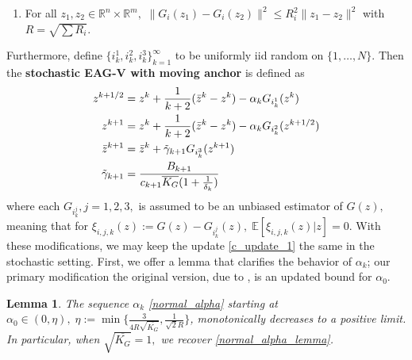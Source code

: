\documentclass[11pt,reqno,oneside]{amsart}
\newtheorem{lemma}[theorem]{Lemma}
\newtheorem{condition}[theorem]{Condition}
\theoremstyle{definition}
\numberwithin{equation}{section}
\begin{document}
\begin{enumerate}
\begin{condition}
\begin{align}
        \mathbb{E}[\big{(}\overline{C_{G}}(z^{k+1/2})-1\big{)}\|G(z^{k+1/2})\|^{2}|\bar{z}^{k},z^{k}] &\leq \frac{C_{2}}{(k+1)^{4}}, \label{summ_cond_2}
    \end{align}
    where $C_{1}, C_{2}$ are fixed positive constants.
    \end{condition}
    With \cref{summability_condition} in mind, we will henceforth use the notation $C_{G}(z^{k}), K_{G}(z^{k})$ to indicate two nonnegative, real-valued functions from $\mathbb{R}^{n} \times \mathbb{R}^{m}$ to $\mathbb{R}$ that behave according to \eqref{summ_cond_1}, \eqref{summ_cond_2}.
    In particular, we note that for any $z^{k}$ coming from a stochastic algorithm, we have that eventually,
    \begin{equation}
        C_{G}(z^{k}) \leq \overline{C_{G}},
    \end{equation}
    where we define $\bar{C_{G}}$ to be the supremum of such condition numbers independent of $z$.
    \label{condition2}
    \item For all $z_{1}, z_{2} \in \mathbb{R}^{n} \times \mathbb{R}^{m},$ $\displaystyle \|G_{i}(z_{1}) - G_{i}(z_{2})\|^{2} \leq R_{i}^{2}\|z_{1} - z_{2}\|^{2}$ with $R = \sqrt{\sum R_{i}}.$ \label{condition3}
\end{enumerate}
Furthermore, define $\{i_{k}^{1}, i_{k}^{2}, i_{k}^{3}\}_{k=1}^{\infty}$ to be uniformly iid random on $\{1, \ldots, N\}$.
Then the \textbf{stochastic EAG-V with moving anchor} is defined as 
\begin{align}
    \label{stoch eagv update1} z^{k+1/2}   &= z^{k} + \frac{1}{k+2}(\bar{z}^{k} - z^{k}) - \alpha_{k}G_{i_{k}^{1}}(z^{k})\\
    \label{stoch eagv update2} z^{k+1}     &= z^{k} + \frac{1}{k+2}(\bar{z}^{k} - z^{k}) - \alpha_{k}G_{i_{k}^{2}}(z^{k + 1/2})\\
    \label{stoch eagv update3} \bar{z}^{k+1}&= \bar{z}^{k} + \Tilde{\gamma}_{k+1}G_{i_{k}^{3}}(z^{k+1}) \\
    \label{gamma_update_2} \Tilde{\gamma}_{k+1} &= \frac{B_{k+1}}{c_{k+1}\overline{K_{G}}(1 + \frac{1}{\delta_{k}})}
\end{align}
where each $G_{i_{k}^{j}}, j=1,2,3,$ is assumed to be an unbiased estimator of $G(z),$ meaning that for $\xi_{i,j,k}(z) := G(z) - G_{i_{k}^{j}}(z),\; \mathbb{E}[\xi_{i,j,k}(z) |z] = 0.$
With these modifications, we may keep the update \eqref{c_update_1} the same in the stochastic setting.
First, we offer a lemma that clarifies the behavior of $\alpha_{k}$; our primary modification the original version, due to \cite{yoon_ryu}, is an updated bound for $\alpha_{0}$.
\begin{lemma} \label{funny_alpha_lemma}
    The sequence $\alpha_{k}$ \eqref{normal_alpha} starting at $\alpha_{0} \in (0, \eta), \; \eta := \min \{\frac{3}{4R\sqrt{\overline{K_{G}}}}, \frac{1}{\sqrt{2}R}\}$, monotonically decreases to a positive limit.
    In particular, when $\sqrt{\overline{K_{G}}} = 1,$ we recover \cref{normal_alpha_lemma}.
\end{lemma}
\end{document}
